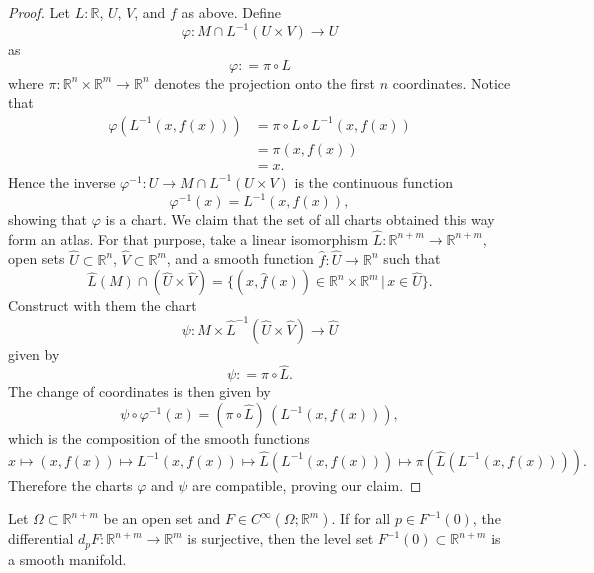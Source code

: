 \documentclass{ximera}
\begin{document}
\begin{proof}
    Let $L : \mathbb{R}$, $U$, $V$, and $f$ as above. Define
    \[ \varphi  : M  \cap L^{-1} (U \times V) \to U \]
    as 
    \[  \varphi : = \pi \circ L             \]
    where $\pi  : \mathbb{R}^n \times \mathbb{R}^m \to \mathbb{R}^n$ denotes the projection onto the first $n$ coordinates.  Notice that  
    \begin{align*}
        \varphi (L^{-1} (x, f(x))) & = \pi \circ L \circ L^{-1} (x, f(x)) \\
        & = \pi (x, f(x)) \\
        & = x .
    \end{align*}
     Hence the inverse $\varphi^{-1} : U \to M \cap L^{-1} (U \times V)$ is the continuous function  
    \[ \varphi  ^{-1} (x) =  L ^{-1} (x, f(x)) ,  \]
    showing that $\varphi$ is a chart. We claim that the set of all charts obtained this way form an atlas. For that purpose, take a linear isomorphism $ \hat{L} : \mathbb{R}^{n+m} \to \mathbb{R}^{n+m}$, open sets $\hat{U} \subset \mathbb{R}^n $, $\hat{V} \subset \mathbb{R}^m$, and a smooth function $\hat{f} : \hat{U} \to \mathbb{R}^n$ such that 
    \[      \hat{L} (M) \cap ( \hat{U} \times \hat{ V}  ) = \{ (x,\hat{f}(x)) \in \mathbb{R}^n \times \mathbb{R}^m  \, \vert \,  x \in \hat{U} \}  . \]
    Construct with them the chart 
    \[             \psi : M \times \hat{L}^{-1} (\hat{U}  \times \hat{V} ) \to \hat{U}                            \]
    given by 
    \[     \psi : = \pi \circ \hat{L} .     \]
    The change of coordinates is then given by
    \[         \psi \circ \varphi ^{-1} (x) = ( \pi \circ \hat{L} ) \, ( L ^{-1} (  x, f( x )  ) )  ,                                     \]
    which is the composition of the smooth functions
    \[       x \mapsto ( x, f(x) ) \mapsto L ^{-1} (x, f(x)) \mapsto \hat{L} ( L ^{-1} (x,f(x)) ) \mapsto \pi (  \hat{L}  ( L^{-1}  (x, f(x))  )  ).                            \]
    Therefore the charts $\varphi$ and $\psi $ are compatible, proving our claim. 
    \end{proof}


    \begin{example}
        Let $\Omega \subset \mathbb{R}^{n+m} $ be an open set and $F \in C^{\infty} ( \Omega ; \mathbb{R}^m  )$. If for all $p \in F^{-1} (0)$, the differential $d_pF : \mathbb{R}^{n+m} \to \mathbb{R}^m$ is surjective, then the level set $F^{-1}(0) \subset \mathbb{R}^{n+m}$ is a smooth manifold.  
    \end{example}
\end{document}
